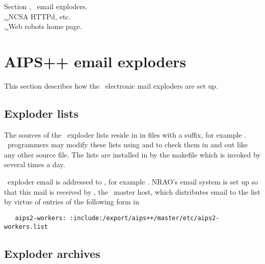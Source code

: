 Section , \aipspp\ email exploders.\\
\href{http://hoohoo.ncsa.uiuc.edu}{, }{NCSA HTTPd}, etc.\\
\href{http://info.webcrawler.com/mak/projects/robots/robots.html}{, }
   {Web robots home page}.


\newpage
\section{AIPS++ email exploders}
\label{email exploders}

This section describes how the \aipspp\ electronic mail exploders are set up.

\subsection*{Exploder lists}

The sources of the \aipspp\ exploder lists reside in
 in files with a  suffix, for
example \mbox{}.  \aipspp\ programmers may modify
these lists using  and  to check them in and out like
any other source file.  The lists are installed in  by the
 makefile which is invoked by  several times
a day.

\aipspp\ exploder email is addressed to , for example
\mbox{}.  NRAO's email system is set up so that
this mail is received by , the \aipspp\ master host,
which distributes email to the list by virtue of entries of the following form
in 

\begin{verbatim}
   aips2-workers: :include:/export/aips++/master/etc/aips2-workers.list
\end{verbatim}

\subsection*{Exploder archives}


